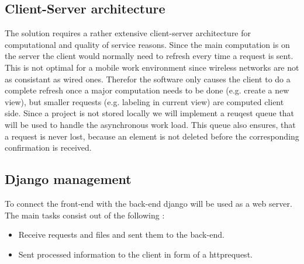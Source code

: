 \documentclass[12pt]{extarticle}
\begin{document}
\subsection{Client-Server architecture}
The solution requires a rather extensive client-server architecture for computational and quality of service reasons. Since the main computation is on the server the client would normally need to refresh every time a request is sent. This is not optimal for a mobile work environment since wireless networks are not as consistant as wired ones. Therefor the software only causes the client to do a complete refresh once a major computation needs to be done (e.g. create a new view), but smaller requests (e.g. labeling in current view) are computed client side. Since a project is not stored locally we will implement a reuqest queue that will be used to handle the asynchronous work load. This queue also ensures, that a request is never lost, because an element is not deleted before the corresponding confirmation is received. 

\subsection{Django management}
To connect the front-end with the back-end django will be used as a web server. The main tasks consist out of the following :
\begin{itemize}
	\item Receive requests and files and sent them to the back-end.
	\item Sent processed information to the client in form of a httprequest.
\end{itemize}
\end{document}
